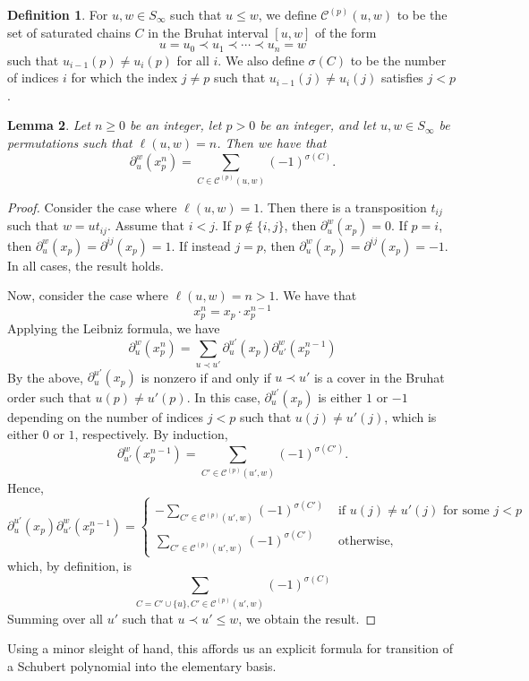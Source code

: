 \documentclass[a4paper,fleqn]{cas-sc}
\newtheorem{lemma}{Lemma}[subsection]
\theoremstyle{definition}
\newtheorem{definition}[lemma]{Definition}
\theoremstyle{remark}
\numberwithin{equation}{subsection}
\begin{document}
\newcommand{\achain}[1]{\mathcal{C}^{(#1)}}
\begin{definition}
For $u,w\in S_\infty$ such that $u\leq w$, we define $\achain{p}(u,w)$ to be the set of saturated chains $C$ in the Bruhat interval $[u,w]$ of the form
$$u=u_0\prec u_1\prec \cdots \prec u_n=w$$  
such that $u_{i-1}(p)\neq u_i(p)$ for all $i$. We also define $\sigma(C)$ to be the number of indices $i$ for which the index $j\neq p$ such that $u_{i-1}(j)\neq u_i(j)$ satisfies $j<p$.
\end{definition}

\begin{lemma} \label{lemma:powerdiff}
Let $n\geq 0$ be an integer, let $p>0$ be an integer, and let $u, w\in S_\infty$ be permutations such that $\ell(u,w)=n$. Then we have that 
$$\partial_u^w(x_p^n) = \sum_{C\in \achain{p}(u,w)} (-1)^{\sigma(C)}.$$
\end{lemma}
\begin{proof}

  

Consider the case where $\ell(u,w)=1$. Then there is a transposition $t_{ij}$ such that $w = ut_{ij}$. Assume that $i<j$. If $p\notin\{i,j\}$, then $\partial_u^w(x_p)=0$. If $p=i$, then $\partial_u^w(x_p) = \partial^{ij}(x_p) = 1$. If instead $j=p$, then $\partial_u^w(x_p) = \partial^{ij}(x_p) = -1$. In all cases, the result holds.

Now, consider the case where $\ell(u,w)=n>1$. We have that
$$x_p^n = x_p\cdot x_p^{n-1}$$
Applying the Leibniz formula, we have
$$\partial_u^w(x_p^n) = \sum_{u\prec u'}\partial_u^{u'}(x_p)\partial_{u'}^w(x_p^{n-1})$$
By the above, $\partial_u^{u'}(x_p)$ is nonzero if and only if $u\prec u'$ is a cover in the Bruhat order such that $u(p)\neq u'(p)$. In this case, $\partial_u^{u'}(x_p)$ is either $1$ or $-1$ depending on the number of indices $j<p$ such that $u(j)\neq u'(j)$, which is either $0$ or $1$, respectively. By induction, 
$$\partial_{u'}^w(x_p^{n-1}) = \sum_{C'\in \achain{p}(u',w)} (-1)^{\sigma(C')}.$$
Hence, 
$$\partial_u^{u'}(x_p)\partial_{u'}^w(x_p^{n-1})=\begin{cases}
-\displaystyle\sum_{C'\in \achain{p}(u',w)} (-1)^{\sigma(C')}&\mbox{ if }u(j)\neq u'(j)\mbox{ for some }j<p\\
\displaystyle\sum_{C'\in \achain{p}(u',w)} (-1)^{\sigma(C')}&\mbox{ otherwise,}
\end{cases}$$
which, by definition, is
$$\sum_{C=C'\cup\{u\}, C'\in \achain{p}(u',w)} (-1)^{\sigma(C)}$$
Summing over all $u'$ such that $u\prec u'\leq w$, we obtain the result.
\end{proof}
Using a minor sleight of hand, this affords us an explicit formula for transition of a Schubert polynomial into the elementary basis.
\end{document}
